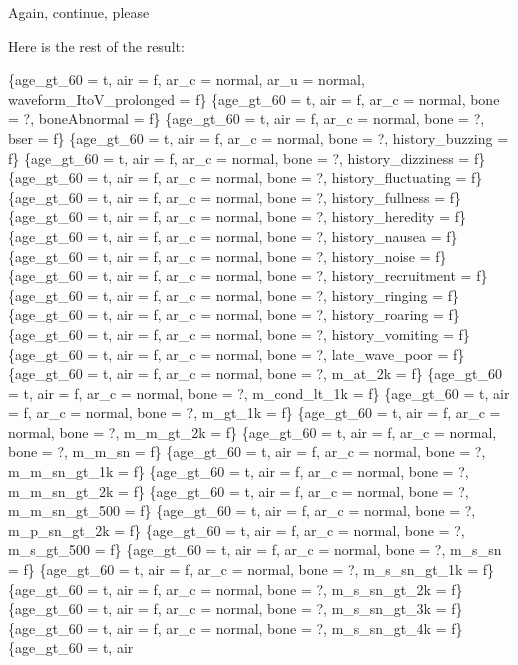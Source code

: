 \documentclass[12pt]{article}
\begin{document}
Again, continue, please

\begin{mdframed}

Here is the rest of the result:
\newline

    \{age\_gt\_60 = t, air = f, ar\_c = normal, ar\_u = normal, waveform\_ItoV\_prolonged = f\}
    \{age\_gt\_60 = t, air = f, ar\_c = normal, bone = ?, boneAbnormal = f\}
    \{age\_gt\_60 = t, air = f, ar\_c = normal, bone = ?, bser = f\}
    \{age\_gt\_60 = t, air = f, ar\_c = normal, bone = ?, history\_buzzing = f\}
    \{age\_gt\_60 = t, air = f, ar\_c = normal, bone = ?, history\_dizziness = f\}
    \{age\_gt\_60 = t, air = f, ar\_c = normal, bone = ?, history\_fluctuating = f\}
    \{age\_gt\_60 = t, air = f, ar\_c = normal, bone = ?, history\_fullness = f\}
    \{age\_gt\_60 = t, air = f, ar\_c = normal, bone = ?, history\_heredity = f\}
    \{age\_gt\_60 = t, air = f, ar\_c = normal, bone = ?, history\_nausea = f\}
    \{age\_gt\_60 = t, air = f, ar\_c = normal, bone = ?, history\_noise = f\}
    \{age\_gt\_60 = t, air = f, ar\_c = normal, bone = ?, history\_recruitment = f\}
    \{age\_gt\_60 = t, air = f, ar\_c = normal, bone = ?, history\_ringing = f\}
    \{age\_gt\_60 = t, air = f, ar\_c = normal, bone = ?, history\_roaring = f\}
    \{age\_gt\_60 = t, air = f, ar\_c = normal, bone = ?, history\_vomiting = f\}
    \{age\_gt\_60 = t, air = f, ar\_c = normal, bone = ?, late\_wave\_poor = f\}
    \{age\_gt\_60 = t, air = f, ar\_c = normal, bone = ?, m\_at\_2k = f\}
    \{age\_gt\_60 = t, air = f, ar\_c = normal, bone = ?, m\_cond\_lt\_1k = f\}
    \{age\_gt\_60 = t, air = f, ar\_c = normal, bone = ?, m\_gt\_1k = f\}
    \{age\_gt\_60 = t, air = f, ar\_c = normal, bone = ?, m\_m\_gt\_2k = f\}
    \{age\_gt\_60 = t, air = f, ar\_c = normal, bone = ?, m\_m\_sn = f\}
    \{age\_gt\_60 = t, air = f, ar\_c = normal, bone = ?, m\_m\_sn\_gt\_1k = f\}
    \{age\_gt\_60 = t, air = f, ar\_c = normal, bone = ?, m\_m\_sn\_gt\_2k = f\}
    \{age\_gt\_60 = t, air = f, ar\_c = normal, bone = ?, m\_m\_sn\_gt\_500 = f\}
    \{age\_gt\_60 = t, air = f, ar\_c = normal, bone = ?, m\_p\_sn\_gt\_2k = f\}
    \{age\_gt\_60 = t, air = f, ar\_c = normal, bone = ?, m\_s\_gt\_500 = f\}
    \{age\_gt\_60 = t, air = f, ar\_c = normal, bone = ?, m\_s\_sn = f\}
    \{age\_gt\_60 = t, air = f, ar\_c = normal, bone = ?, m\_s\_sn\_gt\_1k = f\}
    \{age\_gt\_60 = t, air = f, ar\_c = normal, bone = ?, m\_s\_sn\_gt\_2k = f\}
    \{age\_gt\_60 = t, air = f, ar\_c = normal, bone = ?, m\_s\_sn\_gt\_3k = f\}
    \{age\_gt\_60 = t, air = f, ar\_c = normal, bone = ?, m\_s\_sn\_gt\_4k = f\}
    \{age\_gt\_60 = t, air
\end{mdframed}
\end{document}
